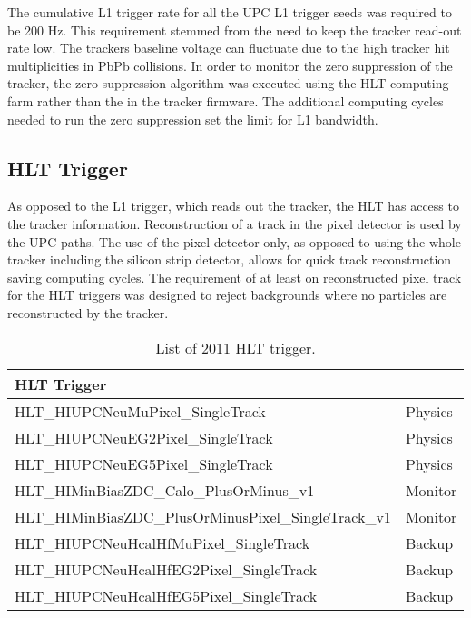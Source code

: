        The cumulative L1 trigger rate for all the UPC L1 trigger seeds was
         required to be 200 Hz.
       This requirement stemmed from the need to keep the tracker read-out rate
         low. 
       The trackers baseline voltage can fluctuate due to the high tracker hit 
         multiplicities in PbPb collisions.
       In order to monitor the zero suppression of the tracker, the zero 
         suppression algorithm was executed using the HLT computing farm 
	 rather than the in the tracker firmware. 
       The additional computing cycles needed to run the zero suppression 
         set the limit for L1 bandwidth. 

    \subsection{HLT Trigger}
      As opposed to the L1 trigger, which reads out the tracker, the HLT has 
        access to the tracker information. 
      Reconstruction of a track in the pixel detector is used by the UPC paths.
      The use of the pixel detector only, as opposed to using the whole tracker 
        including the silicon strip detector, allows for quick track 
	reconstruction saving computing cycles.
      The requirement of at least on reconstructed pixel track for the HLT 
        triggers was designed to reject backgrounds where no particles are 
	reconstructed by the tracker. 
  \begin{table}[h]
		\centering
		\begin{tabular}{|l|l|}
		  \hline HLT Trigger  \\ \hline \hline
		  HLT\_HIUPCNeuMuPixel\_SingleTrack & Physics   \\ \hline
		  HLT\_HIUPCNeuEG2Pixel\_SingleTrack & Physics   \\ \hline
		  HLT\_HIUPCNeuEG5Pixel\_SingleTrack & Physics   \\ \hline
		  HLT\_HIMinBiasZDC\_Calo\_PlusOrMinus\_v1  & Monitor  \\ \hline
		  HLT\_HIMinBiasZDC\_PlusOrMinusPixel\_SingleTrack\_v1   & Monitor \\ \hline
		  HLT\_HIUPCNeuHcalHfMuPixel\_SingleTrack & Backup   \\ \hline
		  HLT\_HIUPCNeuHcalHfEG2Pixel\_SingleTrack & Backup   \\ \hline
		  HLT\_HIUPCNeuHcalHfEG5Pixel\_SingleTrack & Backup   \\ \hline \hline
		\end{tabular}
		\caption{List of 2011 HLT trigger.}
		\label{tab:hltTriggers2011}
	\end{table}


